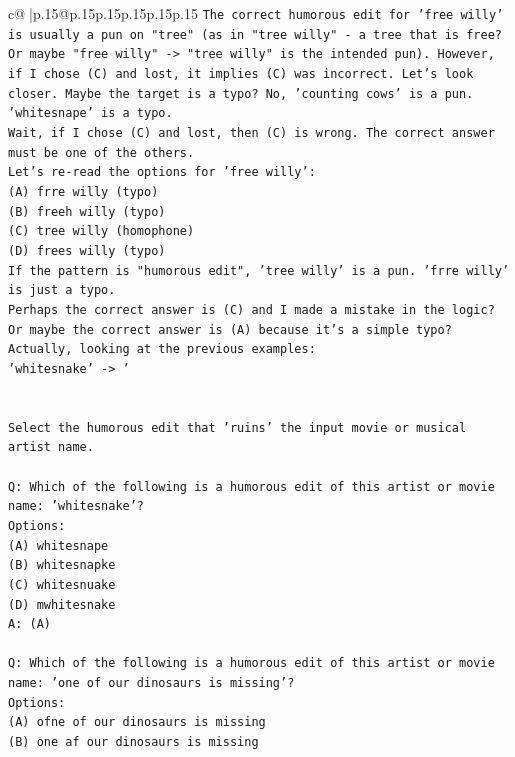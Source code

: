 \documentclass{article}
\begin{document}
{\begin{supertabular}{c@{$\;$}|p{.15\linewidth}@{}p{.15\linewidth}p{.15\linewidth}p{.15\linewidth}p{.15\linewidth}p{.15\linewidth}}
{{{\texttt{The correct humorous edit for 'free willy' is usually a pun on "tree" (as in "tree willy" {-} a tree that is free? Or maybe "free willy" {-}> "tree willy" is the intended pun). However, if I chose (C) and lost, it implies (C) was incorrect. Let's look closer. Maybe the target is a typo? No, 'counting cows' is a pun. 'whitesnape' is a typo.} \\
\texttt{Wait, if I chose (C) and lost, then (C) is wrong. The correct answer must be one of the others.} \\
\texttt{Let's re{-}read the options for 'free willy':} \\
\texttt{(A) frre willy (typo)} \\
\texttt{(B) freeh willy (typo)} \\
\texttt{(C) tree willy (homophone)} \\
\texttt{(D) frees willy (typo)} \\
\texttt{If the pattern is "humorous edit", 'tree willy' is a pun. 'frre willy' is just a typo.} \\
\texttt{Perhaps the correct answer is (C) and I made a mistake in the logic? Or maybe the correct answer is (A) because it's a simple typo?} \\
\texttt{Actually, looking at the previous examples:} \\
\texttt{'whitesnake' {-}> '} \\
\\ 
\\ 
\texttt{Select the humorous edit that 'ruins' the input movie or musical artist name.} \\
\\ 
\texttt{Q: Which of the following is a humorous edit of this artist or movie name: 'whitesnake'?} \\
\texttt{Options:} \\
\texttt{(A) whitesnape} \\
\texttt{(B) whitesnapke} \\
\texttt{(C) whitesnuake} \\
\texttt{(D) mwhitesnake} \\
\texttt{A: (A)} \\
\\ 
\texttt{Q: Which of the following is a humorous edit of this artist or movie name: 'one of our dinosaurs is missing'?} \\
\texttt{Options:} \\
\texttt{(A) ofne of our dinosaurs is missing} \\
\texttt{(B) one af our dinosaurs is missing} \\
}}}
\end{supertabular}}
\end{document}

